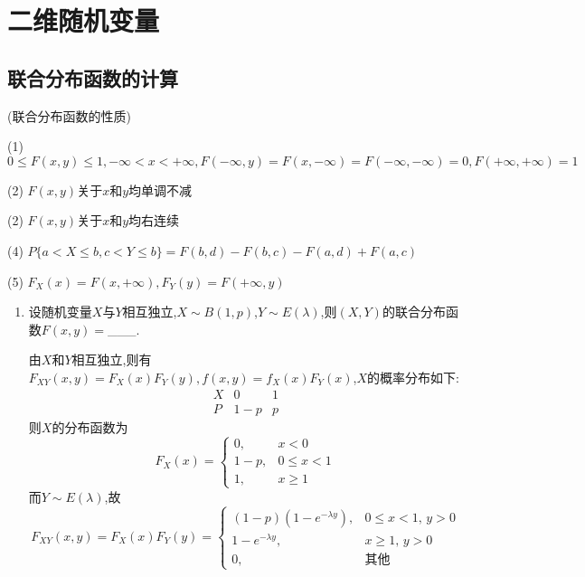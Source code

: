 \documentclass[12pt, a4paper, oneside, UTF8]{ctexbook}
\begin{document}
% 
\else
\fi
\chapter{二维随机变量}

\section{联合分布函数的计算}
\begin{remark}
    (联合分布函数的性质)
    \item[(1)] $0\leq F(x,y)\leq 1,-\infty<x<+\infty, F(-\infty,y)=F(x,-\infty)=F(-\infty,-\infty)=0,F(+\infty,+\infty)=1$
    \item[(2)] $F(x,y)$关于$x$和$y$均单调不减
    \item[(2)] $F(x,y)$关于$x$和$y$均右连续
    \item[(4)] $P\{a<X\leq b,c<Y\leq b\}=F(b,d)-F(b,c)-F(a,d)+F(a,c)$ 
    \item[(5)] $F_{X}(x)=F(x,+\infty),F_{Y}(y)=F(+\infty, y)$  
\end{remark}

\begin{enumerate}[label=\arabic*.]
    \item 设随机变量$X$与$Y$相互独立,$X\sim B(1,p)$,$Y\sim E(\lambda)$,则$(X,Y)$的联合分布函数$F(x,y)=$\_\_\_.
    
    \begin{solution}
    由$X$和$Y$相互独立,则有$F_{XY}(x,y)=F_{X}(x)F_{Y}(y),f(x,y)=f_{X}(x)F_{Y}(x)$,$X$的概率分布如下:
    \[
    \begin{array}{c|c|c}
        X&0&1\\
        \hline
        P&1-p&p
    \end{array}
    \]
    则$X$的分布函数为
    \[F_{X}(x)=
    \begin{cases}
        0, & x < 0\\
        1-p, & 0\leq x < 1\\
        1, &x\geq 1
    \end{cases}
    \]
    而$Y\sim E(\lambda)$,故
    \[
    F_{XY}(x,y)=F_{X}(x)F_{Y}(y)=\begin{cases}
        (1-p)(1-e^{-\lambda y}), & 0\leq x < 1,\, y > 0 \\
        1-e^{-\lambda y}, & x\geq 1,\, y > 0\\
        0, & \text{其他}
    \end{cases}
    \]
    \end{solution}
\end{enumerate}
\end{document}
